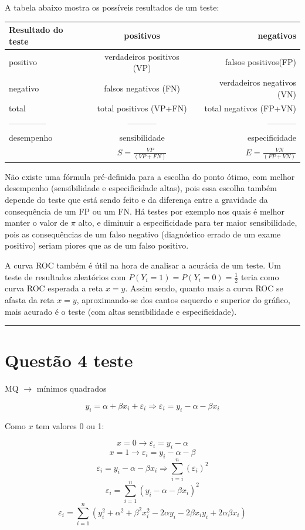 \documentclass[11pt,]{article}
\begin{document}
A tabela abaixo mostra os possíveis resultados de um teste:

\begin{longtable}[]{@{}lcr@{}}
\toprule
Resultado do teste & positivos & negativos\tabularnewline
\midrule
\endhead
positivo & verdadeiros positivos (VP) & falsos
positivos(FP)\tabularnewline
negativo & falsos negativos (FN) & verdadeiros negativos
(VN)\tabularnewline
total & total positivos (VP+FN) & total negativos (FP+VN)\tabularnewline
-------------- & ----------- & -----------\tabularnewline
desempenho & sensibilidade & especificidade\tabularnewline
& \(S= \frac{VP}{(VP+FN)}\) & \(E= \frac{VN}{(FP+VN)}\)\tabularnewline
\bottomrule
\end{longtable}

Não existe uma fórmula pré-definida para a escolha do ponto ótimo, com
melhor desempenho (sensibilidade e especificidade altas), pois essa
escolha também depende do teste que está sendo feito e da diferença
entre a gravidade da consequência de um FP ou um FN. Há testes por
exemplo nos quais é melhor manter o valor de \(\pi\) alto, e diminuir a
especificidade para ter maior sensibilidade, pois as consequências de um
falso negativo (diagnóstico errado de um exame positivo) seriam piores
que as de um falso positivo.

A curva ROC também é útil na hora de analisar a acurácia de um teste. Um
teste de resultados aleatórios com
\(P(Y_{i}=1)=P(Y_{i}=0)= \frac{1}{2}\) teria como curva ROC esperada a
reta \(x=y\). Assim sendo, quanto mais a curva ROC se afasta da reta
\(x=y\), aproximando-se dos cantos esquerdo e superior do gráfico, mais
acurado é o teste (com altas sensibilidade e especificidade).

\begin{center}\rule{0.5\linewidth}{\linethickness}\end{center}

\section{Questão 4 teste}\label{questao-4-teste}

MQ \(\rightarrow\) mínimos quadrados

\[y_{i}= \alpha + \beta x_{i} + \varepsilon_{i} \Rightarrow \varepsilon_{i} = y_{i} - \alpha - \beta x_{i}\]

Como \(x\) tem valores 0 ou 1:

\[x = 0 \rightarrow \varepsilon_{i} = y_{i}- \alpha\]
\[x= 1 \rightarrow \varepsilon_{i} = y_{i} - \alpha - \beta\]
\[\varepsilon_{i} = y_{i} - \alpha - \beta x_{i} \Rightarrow \sum_{i=i}^n ( \varepsilon_{i})^2\]
\[\varepsilon_{i} = \sum_{i=1}^n ( y_{i} - \alpha - \beta x_{i} )^2\]
\[\varepsilon_{i} = \sum_{i=1}^n (y_{i}^2 + \alpha^2 + \beta^2 x_{i}^2 - 2 \alpha y_{i} - 2 \beta x_{i} y_{i} + 2 \alpha \beta x_{i})\]
\end{document}

